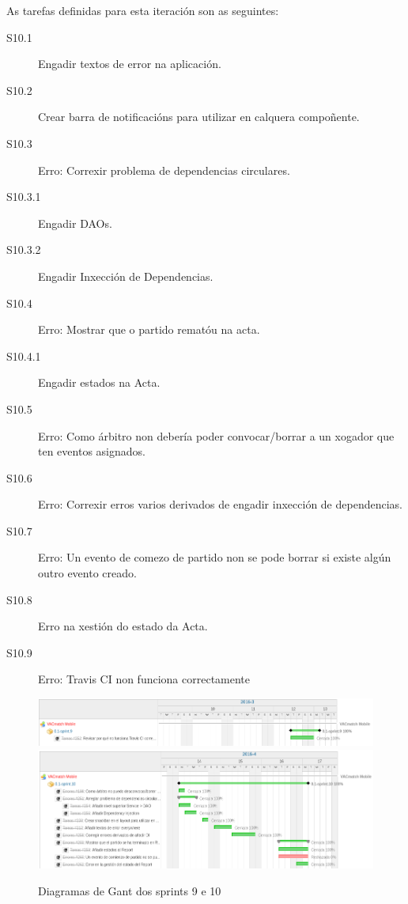       As tarefas definidas para esta iteración son as seguintes:

      \begin{description}
       \item [S10.1] Engadir textos de error na aplicación.
       \item [S10.2] Crear barra de notificacións para utilizar en calquera 
compoñente.
       \item [S10.3] Erro: Correxir problema de dependencias circulares.
       \item [S10.3.1] Engadir DAOs.
       \item [S10.3.2] Engadir Inxección de Dependencias.
       \item [S10.4] Erro: Mostrar que o partido rematóu na acta.
       \item [S10.4.1] Engadir estados na Acta.
       \item [S10.5] Erro: Como árbitro non debería poder convocar/borrar a un 
xogador que ten eventos asignados.
       \item [S10.6] Erro: Correxir erros varios derivados de engadir inxección 
de dependencias.
       \item [S10.7] Erro: Un evento de comezo de partido non se pode borrar si 
existe algún outro evento creado.
       \item [S10.8] Erro na xestión do estado da Acta.
       \item [S10.9] Erro: Travis CI non funciona correctamente
      \end{description}

        \begin{figure}[h!]
          \begin{center}
          \includegraphics[width=\textwidth]{./img/gant_diagrams/09.png}
          \includegraphics[width=\textwidth]{./img/gant_diagrams/10.png}
          \caption{Diagramas de Gant dos sprints 9 e 10}
          \label{fig:gant10}
          \end{center}
        \end{figure}

